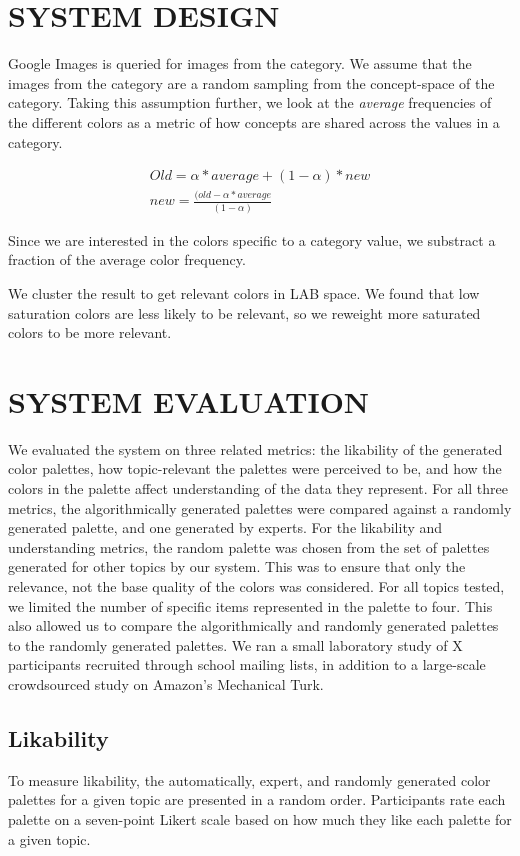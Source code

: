 \documentclass{article}
\begin{document}
\section{SYSTEM DESIGN}
Google Images is queried for images from  the category.
We assume that the images from the category are a random sampling from the concept-space of the category. Taking this assumption further, we look at the {\em average} frequencies of the different colors as a metric of how concepts are shared across the values in a category.

\begin{align}
Old = \alpha*average + (1-\alpha)*new \\
  new = \frac{(old - \alpha*average}{(1-\alpha)} 
\end{align}

Since we are interested in the colors specific to a category value, we substract a fraction of the average color frequency. 

We cluster the result to get relevant colors in LAB space. We found that low saturation colors are less likely to be relevant, 
so we reweight more saturated colors to be more relevant.

\section{SYSTEM EVALUATION}
We evaluated the system on three related metrics: the likability of the generated color palettes, how topic-relevant the palettes were perceived to be, and how the colors in the palette affect understanding of the data they represent. For all three metrics, the algorithmically generated palettes were compared against a randomly generated palette, and one generated by experts. For the likability and understanding metrics, the random palette was chosen from the set of palettes generated for other topics by our system. This was to ensure that only the relevance, not the base quality of the colors was considered. For all topics tested, we limited the number of specific items represented in the palette to four. This also allowed us to compare the algorithmically and randomly generated palettes to the randomly generated palettes. We ran a small laboratory study of X participants recruited through school mailing lists, in addition to a large-scale crowdsourced study on Amazon's Mechanical Turk. 

\subsection{Likability}
To measure likability, the automatically, expert, and randomly generated color palettes for a given topic are presented in a random order. Participants rate each palette on a seven-point Likert scale based on how much they like each palette for a given topic. 
\end{document}
